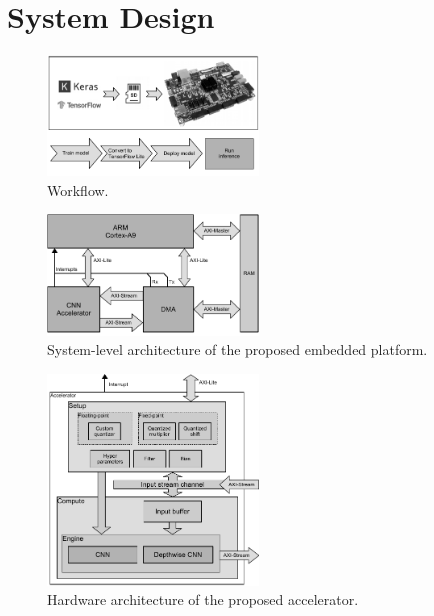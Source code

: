 \section{System Design}
\label{sec:system_design}

\begin{figure}[t!]
	\centering
	\includegraphics[width=0.5\textwidth]{../figures/workflow.pdf}
	\caption{Workflow.}
	\label{fig:workflow}
\end{figure}

\begin{figure}[t!]
	\centering
	\includegraphics[width=0.5\textwidth]{../figures/system_design.pdf}
	\caption{System-level architecture of the proposed embedded platform.}
	\label{fig:system_architecture}
\end{figure}

\begin{figure}[t!]
	\centering
	\includegraphics[width=0.5\textwidth]{../figures/accelerator.pdf}
	\caption{Hardware architecture of the proposed accelerator.}
	\label{fig:accelerator}
\end{figure}

